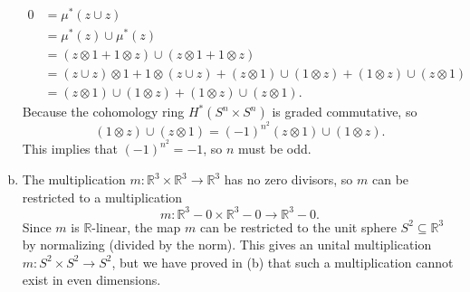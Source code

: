 \documentclass[letterpaper, 12pt]{article}
\begin{document}
\begin{solution}
\begin{enumerate}[(a)]
\begin{align*}
0&=\mu^*(z\cup z)\\
 &=\mu^*(z)\cup\mu^*(z)\\ 
 &=(z\otimes 1+1\otimes z)\cup (z\otimes 1+1\otimes z)\\ 
 &=(z\cup z)\otimes 1+1\otimes (z\cup z)+ (z\otimes 1)\cup (1\otimes z)+(1\otimes z)\cup (z\otimes 1)\\
 &=(z\otimes 1)\cup (1\otimes z)+(1\otimes z)\cup (z\otimes 1).
\end{align*}
Because the cohomology ring \(H^*(S^n\times S^n)\) is graded commutative, so 
\[(1\otimes z)\cup (z\otimes 1)=(-1)^{n^2}(z\otimes 1)\cup (1\otimes z).\]
This implies that \((-1)^{n^2}=-1\), so \(n\) must be odd. 
\item The multiplication \(m:\mathbb{R}^3\times \mathbb{R}^3\rightarrow \mathbb{R}^3\) has no zero divisors, so \(m\) can be restricted to a multiplication
\[m:\mathbb{R}^3-0\times \mathbb{R}^3-0\rightarrow \mathbb{R}^3-0.\]
Since \(m\) is \(\mathbb{R}\)-linear, the map \(m\) can be restricted to the unit sphere \(S^2\subseteq \mathbb{R}^3\) by normalizing (divided by the norm). This gives an unital multiplication \(m:S^2\times S^2\rightarrow S^2\), but we have proved in (b) that such a multiplication cannot exist in even dimensions. 
\end{enumerate}
\end{solution}
\end{document}
